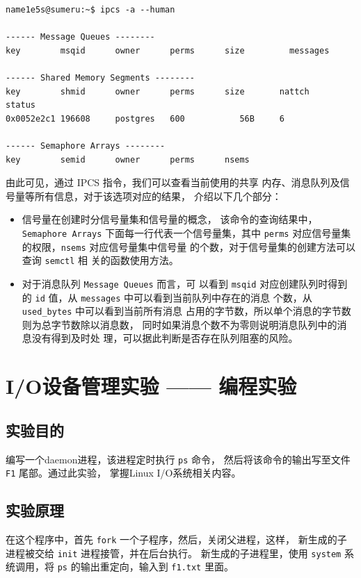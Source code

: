 \documentclass[blue,normal,cn]{elegantnote}
\newcommand{\code}[1]{\colorbox{light-gray}{\texttt{#1}}}
\begin{document}
\begin{lstlisting}
name1e5s@sumeru:~$ ipcs -a --human

------ Message Queues --------
key        msqid      owner      perms      size         messages

------ Shared Memory Segments --------
key        shmid      owner      perms      size       nattch     status
0x0052e2c1 196608     postgres   600           56B     6

------ Semaphore Arrays --------
key        semid      owner      perms      nsems
\end{lstlisting}

由此可见，通过 IPCS 指令，我们可以查看当前使用的共享
内存、消息队列及信号量等所有信息，对于该选项对应的结果，
介绍以下几个部分：
\begin{itemize}
  \item 信号量在创建时分信号量集和信号量的概念，
  该命令的查询结果中，\code{Semaphore Arrays} 
  下面每一行代表一个信号量集，其中 \code{perms} 
  对应信号量集的权限，\code{nsems} 对应信号量集中信号量
  的个数，对于信号量集的创建方法可以查询 \code{semctl} 相
  关的函数使用方法。
  \item 对于消息队列 \code{Message Queues} 而言，可
  以看到 \code{msqid} 对应创建队列时得到的 \code{id} 
  值，从 \code{messages} 中可以看到当前队列中存在的消息
  个数，从 \code{used\_bytes} 中可以看到当前所有消息
  占用的字节数，所以单个消息的字节数则为总字节数除以消息数，
  同时如果消息个数不为零则说明消息队列中的消息没有得到及时处
  理，可以据此判断是否存在队列阻塞的风险。
\end{itemize}

\section{I/O设备管理实验 —— 编程实验}
\subsection{实验目的}
编写一个daemon进程，该进程定时执行 \code{ps} 命令，
然后将该命令的输出写至文件 \code{F1} 尾部。通过此实验，
掌握Linux I/O系统相关内容。
\subsection{实验原理}
在这个程序中，首先 \code{fork} 一个子程序，然后，关闭父进程，这样，
新生成的子进程被交给 \code{init} 进程接管，并在后台执行。
新生成的子进程里，使用 \code{system} 系统调用，将
\code{ps} 的输出重定向，输入到 \code{f1.txt} 里面。
\end{document}
